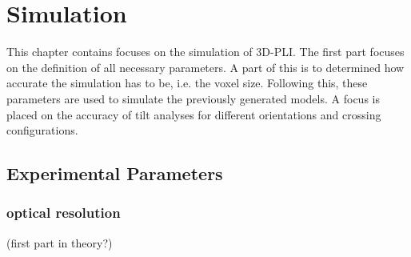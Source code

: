 \setcounter{chapter}{7}
\chapter{Simulation}
\label{cha:simulation_analysis}
% 
% 
% 
This chapter contains focuses on the simulation of \ac{3D-PLI}.
The first part focuses on the definition of all necessary parameters.
A part of this is to determined how accurate the simulation has to be, i.e. the voxel size.
Following this, these parameters are used to simulate the previously generated models.
A focus is placed on the accuracy of tilt analyses for different orientations and crossing configurations.
% 
% 
% 
% 
% 
\section{Experimental Parameters}\label{sec:sim_choose_parameters}
% 
\subsection{optical resolution}
% 
(first part in theory?)\\

